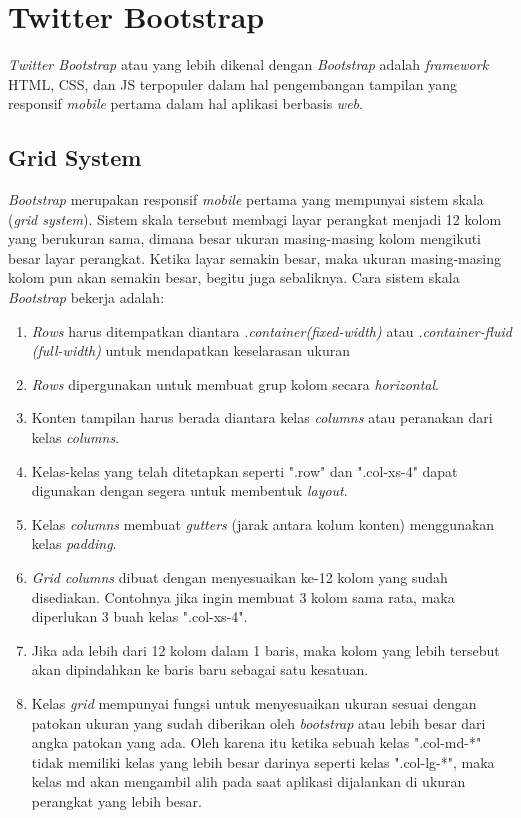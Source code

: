 \section{Twitter Bootstrap}
\label{sec: Bootrstrap}

\textit{Twitter Bootstrap} \cite{bootstrap} atau yang lebih dikenal dengan \textit{Bootstrap} adalah \textit{framework} HTML, CSS, dan JS terpopuler dalam hal pengembangan tampilan yang responsif \textit{mobile} pertama dalam hal aplikasi berbasis \textit{web}. 

\subsection{Grid System}
\label{sub: gridSystem}

\textit{Bootstrap} merupakan responsif \textit{mobile} pertama yang mempunyai sistem skala (\textit{grid system}). Sistem skala tersebut membagi layar perangkat menjadi 12 kolom yang berukuran sama, dimana besar ukuran masing-masing kolom mengikuti besar layar perangkat. Ketika layar semakin besar, maka ukuran masing-masing kolom pun akan semakin besar, begitu juga sebaliknya. Cara sistem skala \textit{Bootstrap} bekerja adalah:

\begin{enumerate}
	\item \textit{Rows} harus ditempatkan diantara \textit{.container(fixed-width)} atau \textit{.container-fluid (full-width)} untuk mendapatkan keselarasan ukuran
	\item \textit{Rows} dipergunakan untuk membuat grup kolom secara \textit{horizontal}.
	\item Konten tampilan harus berada diantara kelas \textit{columns} atau peranakan dari kelas \textit{columns}.
	\item Kelas-kelas yang telah ditetapkan seperti ".row" dan ".col-xs-4" dapat digunakan dengan segera untuk membentuk \textit{layout}.
	\item Kelas \textit{columns} membuat \textit{gutters} (jarak antara kolum konten) menggunakan kelas \textit{padding}.
	\item \textit{Grid columns} dibuat dengan menyesuaikan ke-12 kolom yang sudah disediakan. Contohnya jika ingin membuat 3 kolom sama rata, maka diperlukan 3 buah kelas ".col-xs-4".
	\item Jika ada lebih dari 12 kolom dalam 1 baris, maka kolom yang lebih tersebut akan dipindahkan ke baris baru sebagai satu kesatuan.
	\item Kelas \textit{grid} mempunyai fungsi untuk menyesuaikan ukuran sesuai dengan patokan ukuran yang sudah diberikan oleh \textit{bootstrap} atau lebih besar dari angka patokan yang ada. Oleh karena itu ketika sebuah kelas ".col-md-*" tidak memiliki kelas yang lebih besar darinya seperti kelas ".col-lg-*", maka kelas md akan mengambil alih pada saat aplikasi dijalankan di ukuran perangkat yang lebih besar. 
\end{enumerate}
	
